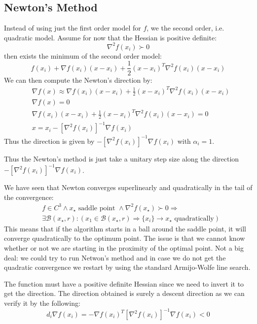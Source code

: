\subsection{Newton's Method}
\par Instead of using just the first order model for $f$, we the second order, i.e. quadratic model. Assume for now that the Hessian is positive definite:
\[
    \nabla ^ 2 f(x_i) \succ 0
\]
then exists the minimum of the second order model:
\[
    f(x_i) + \nabla f(x_i) (x-x_i) + \frac{1}{2} (x-x_i)^{T} \nabla ^ 2 f(x_i) (x-x_i)
\]
We can then compute the Newton's direction by:
\begin{align}
    & \nabla f(x) \approx \nabla f(x_i) (x-x_i) + \frac{1}{2} (x-x_i)^{T} \nabla ^ 2 f(x_i) (x-x_i)\\
    & \nabla f(x) = 0\\
    & \nabla f(x_i) (x-x_i) + \frac{1}{2} (x-x_i)^{T} \nabla ^ 2 f(x_i) (x-x_i) = 0\\
    & x = x_i - [\nabla ^ 2 f(x_i)] ^ {-1} \nabla f(x_i)
\end{align}
Thus the direction is given by $- [\nabla ^ 2 f(x_i)] ^ {-1} \nabla f(x_i)$ with $\alpha_i = 1$.
\par Thus the Newton's method is just take a unitary step size along the direction $- [\nabla ^ 2 f(x_i)] ^ {-1} \nabla f(x_i)$.
\par We have seen that Newton converges superlinearly and quadratically in the tail of the convergence:
\begin{align*}
    &f \in C^3 \wedge x_{\star} \text{ saddle point } \wedge \nabla ^ 2 f(x_{\star}) \succ 0 \Rightarrow\\
    &\exists \mathcal{B}(x_{\star}, r) : (x_1 \in \mathcal{B}(x_{\star}, r) \Rightarrow \{x_i\} \rightarrow x_{\star} \text{ quadratically})
\end{align*}
This means that if the algorithm starts in a ball around the saddle point, it will converge quadratically to the optimum point. The issue is that we cannot know whether or not we are starting in the proximity of the optimal point. Not a big deal: we could try to run Netwon's method and in case we do not get the quadratic convergence we restart by using the standard Armijo-Wolfe line search.
\par The function must have a positive definite Hessian since we need to invert it to get the direction. The direction obtained is surely a descent direction as we can verify it by the following:
\[
    d_i \nabla f(x_i) = - \nabla f(x_i)^{T} [\nabla^2 f(x_i)]^{-1} \nabla f(x_i) < 0
\]
